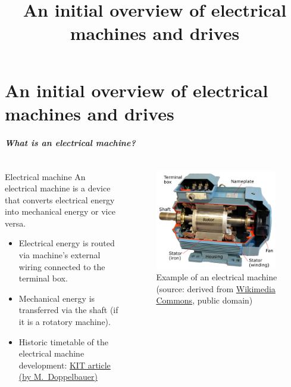 \part{An initial overview of electrical machines and drives}
\title[Initial overview]{An initial overview of electrical machines and drives}  
\date{}  
\frame{\titlepage} 

\begin{frame}
	\frametitle{What is an electrical machine?}
	\begin{columns}
		\begin{column}{0.5\textwidth}
			\begin{varblock}{Electrical machine}
				An electrical machine is a device that converts electrical energy into  mechanical energy or vice versa.
			\end{varblock}
			\vspace{0.25cm}
			\begin{itemize}
				\item Electrical energy is routed via machine's external wiring connected to the terminal box.
				\item Mechanical energy is transferred via the shaft (if it is a rotatory machine).
				\item Historic timetable of the electrical machine development: \href{https://www.eti.kit.edu/english/1376.php}{KIT article (by M.~Doppelbauer)}
			\end{itemize}
		\end{column}
		\begin{column}{0.5\textwidth}
			\begin{figure}
				\centering
				\includegraphics[width=0.95\textwidth]{fig/lec01/Induction_machine_opened.pdf}
				\caption{Example of an electrical machine (source: derived from \href{https://commons.wikimedia.org/wiki/File:TMW_50906_Schnittmodell_einer_Drehstrommaschine_(Asynchronmaschine).jpg}{Wikimedia Commons}, public domain)}
			\end{figure}
		\end{column}
		\end{columns}
\end{frame}

